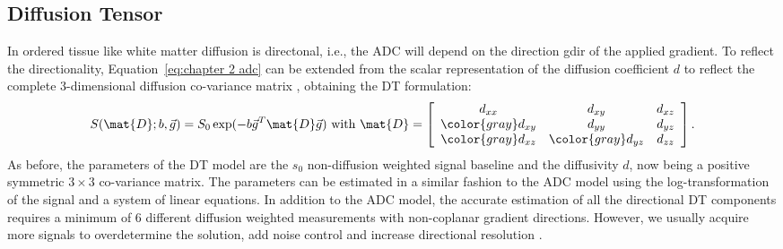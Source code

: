 \subsection{Diffusion Tensor}
\label{subsec:dti}
In ordered tissue like white matter diffusion is directonal, i.e., the \gls{ADC} will depend on the direction {\gls{gdir}} of the applied gradient. To reflect the directionality, Equation~\ref{eq:chapter 2 adc} can be extended from the scalar representation of the diffusion coefficient $d$ to reflect the complete 3-dimensional diffusion co-variance matrix \citep{Basser:1994}, obtaining the {\gls{DT}} formulation:
\begin{equation}
	S(\mat{D};b,\vec{g}) = S_{0}\exp(-b\vec{g}^T \mat{D}\vec{g}) \mbox{ with } \mat{D} = 
	\left[
	\begin{array}{ccc}
	d_{xx} & d_{xy} & d_{xz} \\
	{\color{gray} d_{xy}} & d_{yy} & d_{yz} \\
	{\color{gray} d_{xz}} & {\color{gray} d_{yz}} & d_{zz} 	
	\end{array} \right].	
    \label{eq:dti}
\end{equation}
As before, the parameters of the {\gls{DT}} model are the $s_0$ non-diffusion weighted signal baseline and the diffusivity $d$, now being a positive symmetric $3\times3$ co-variance matrix. The parameters can be estimated in a similar fashion to the ADC model using the log-transformation of the signal and a system of linear equations. In addition to the ADC model, the accurate estimation of all the directional {\gls{DT}} components requires a minimum of 6 different diffusion weighted measurements with non-coplanar gradient directions. However, we usually acquire more signals to overdetermine the solution, add noise control and increase directional resolution \citep{Jones:2004a}.


